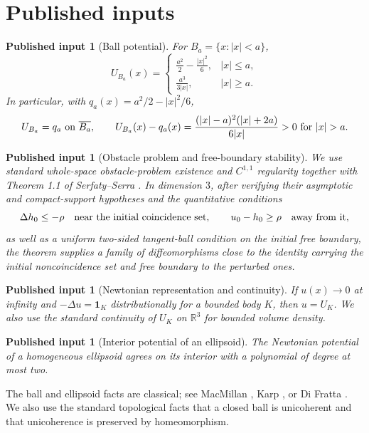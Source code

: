 \documentclass[11pt]{article}
\newtheorem{external}[theorem]{Published input}
\theoremstyle{definition}
\theoremstyle{remark}
\newcommand{\R}{\mathbb{R}}
\newcommand{\lap}{\Delta}
\newcommand{\1}{\mathbf{1}}
\begin{document}
\section{Published inputs}

\begin{external}[Ball potential]\label{ext:ball}
For $B_a=\{x:|x|<a\}$,
\[
 U_{B_a}(x)=
 \begin{cases}
 \displaystyle\frac{a^2}{2}-\frac{|x|^2}{6},&|x|\le a,\\[5pt]
 \displaystyle\frac{a^3}{3|x|},&|x|\ge a.
 \end{cases}
\]
In particular, with $q_a(x)=a^2/2-|x|^2/6$,
\begin{equation}\label{eq:ballgap}
 U_{B_a}=q_a\ \hbox{on }\overline{B_a},
 \qquad
 U_{B_a}(x)-q_a(x)=\frac{(|x|-a)^2(|x|+2a)}{6|x|}>0
 \ \hbox{for }|x|>a.
\end{equation}
\end{external}

\begin{external}[Obstacle problem and free-boundary stability]\label{ext:obstacleSS}
We use standard whole-space obstacle-problem existence and $C^{1,1}$ regularity together with Theorem 1.1 of Serfaty--Serra \cite{SerfatySerra}. In dimension $3$, after verifying their asymptotic and compact-support hypotheses and the quantitative conditions
\[
 \lap h_0\le-\rho\quad\hbox{near the initial coincidence set},
 \qquad
 u_0-h_0\ge\rho\quad\hbox{away from it},
\]
as well as a uniform two-sided tangent-ball condition on the initial free boundary, the theorem supplies a family of diffeomorphisms close to the identity carrying the initial noncoincidence set and free boundary to the perturbed ones.
\end{external}

\begin{external}[Newtonian representation and continuity]\label{ext:newtonunique}
If $u(x)\to0$ at infinity and $-\lap u=\1_K$ distributionally for a bounded body $K$, then $u=U_K$. We also use the standard continuity of $U_K$ on $\R^3$ for bounded volume density.
\end{external}

\begin{external}[Interior potential of an ellipsoid]\label{ext:ellipsoid}
The Newtonian potential of a homogeneous ellipsoid agrees on its interior with a polynomial of degree at most two.
\end{external}

The ball and ellipsoid facts are classical; see MacMillan \cite{MacMillan}, Karp \cite{Karp}, or Di Fratta \cite{DiFratta}. We also use the standard topological facts that a closed ball is unicoherent and that unicoherence is preserved by homeomorphism.
\end{document}
